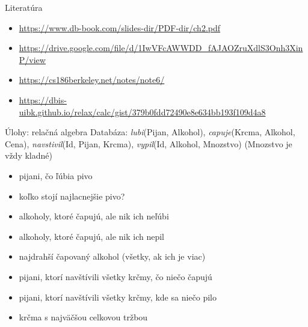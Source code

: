 \documentclass[12pt]{beamer}
\begin{document}
\begin{frame}{Literatúra}
\begin{itemize}
\item {\scriptsize\url{https://www.db-book.com/slides-dir/PDF-dir/ch2.pdf}}
\item {\scriptsize\url{https://drive.google.com/file/d/1IwVFcAWWDD_fAJAOZruXdlS3Onh3XinP/view}}
\item {\scriptsize\url{https://cs186berkeley.net/notes/note6/}}
\item {\scriptsize\url{https://dbis-uibk.github.io/relax/calc/gist/379b0fdd72490e8e634bb193f109d4a8}}
\end{itemize}
\end{frame}


\begin{frame}{Úlohy: relačná algebra}
Databáza: \emph{lubi}(Pijan, Alkohol), \emph{capuje}(Krcma, Alkohol, Cena),
\emph{navstivil}(Id, Pijan, Krcma), \emph{vypil}(Id, Alkohol, Mnozstvo)
(Mnozstvo je vždy kladné)
\begin{itemize}
	\item pijani, čo ľúbia pivo
	\item koľko stojí najlacnejšie pivo?
    \item alkoholy, ktoré čapujú, ale nik ich neľúbi
    \item alkoholy, ktoré čapujú, ale nik ich nepil
	\item najdrahší čapovaný alkohol (všetky, ak ich je viac)
	\item pijani, ktorí navštívili všetky krčmy, čo niečo čapujú
    \item pijani, ktorí navštívili všetky krčmy, kde sa niečo pilo
    \item krčma s najväčšou celkovou tržbou
\end{itemize}
\end{frame}
\end{document}
